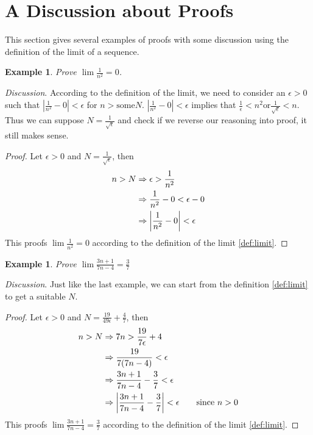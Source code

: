 \documentclass[12pt, lettersize]{book}
\newtheorem{eg}[thm]{Example}
\begin{document}
	\section{A Discussion about Proofs}
		This section gives several examples of proofs with some discussion using the definition of the limit of a sequence.
		\begin{eg}
		Prove $\lim \frac{1}{n^2}=0$.
		\end{eg}
		\emph{Discussion}. According to the definition of the limit, we need to consider an $\epsilon >0$ such that $|\frac{1}{n^2}-0|<\epsilon$ for $n>\text{some}N$.
		$|\frac{1}{n^2}-0|<\epsilon$ implies that $\frac{1}{\epsilon}<n^2 \text{or} \frac{1}{\sqrt{\epsilon}}<n$.
		Thus we can suppose $N=\frac{1}{\sqrt{\epsilon}}$ and check if we reverse our reasoning into proof, it still makes sense. 
		\begin{proof}
		Let $\epsilon>0$ and $N=\frac{1}{\sqrt{\epsilon}}$, then
		\begin{align*}
			n>N &\Rightarrow \epsilon > \frac{1}{n^2}\\
				&\Rightarrow \frac{1}{n^2}-0 < \epsilon -0\\
				&\Rightarrow \abs{\frac{1}{n^2}-0}<\epsilon
		\end{align*}
		This proofs $\lim \frac{1}{n^2}=0$ according to the definition of the limit \ref{def:limit}.
		\end{proof}
		
		\begin{eg}
		Prove $\lim \frac{3n+1}{7n-4}=\frac{3}{7}$
		\end{eg}
		\emph{Discussion}. Just like the last example, we can start from the definition \ref{def:limit} to get a suitable $N$.
		\begin{proof}
			Let $\epsilon>0$ and $N=\frac{19}{49\epsilon}+\frac{4}{7}$, then
		\begin{align*}
			n>N &\Rightarrow 7n>\frac{19}{7\epsilon}+4\\
				&\Rightarrow \frac{19}{7(7n-4)}<\epsilon\\
				&\Rightarrow \frac{3n+1}{7n-4} - \frac{3}{7}<\epsilon\\
				&\Rightarrow \abs{\frac{3n+1}{7n-4} - \frac{3}{7}}<\epsilon\qquad \text{since}\ n>0
		\end{align*}
		This proofs $\lim \frac{3n+1}{7n-4}=\frac{3}{7}$ according to the definition of the limit \ref{def:limit}.
		\end{proof}
		
\end{document}
